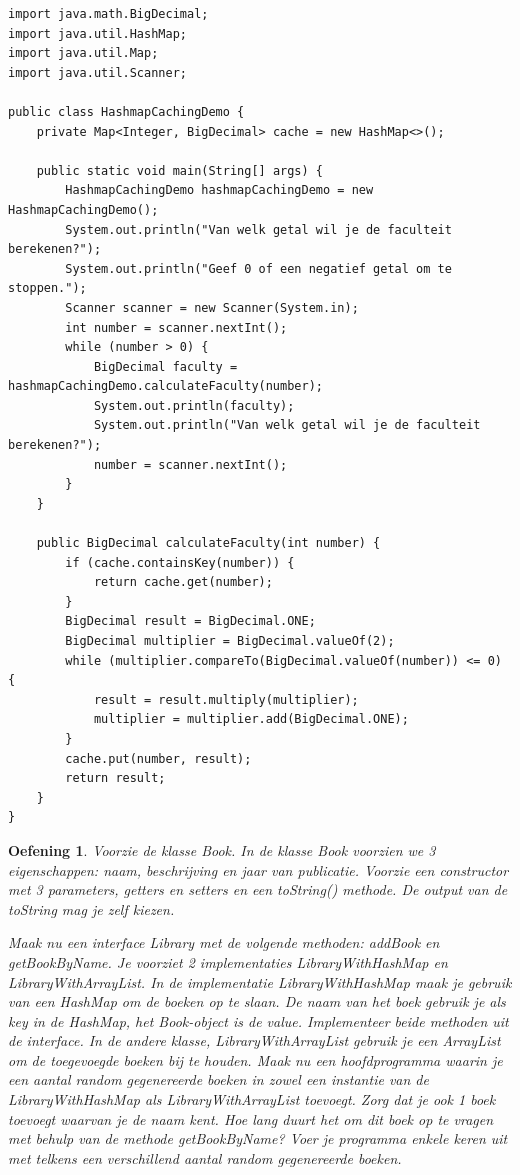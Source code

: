 \documentclass{tstextbook}
\newtheorem{envoefening}{Oefening}[chapter]
\newenvironment{oefening}
               {\begin{boxexercise}\begin{envoefening}}
               {\end{envoefening}\end{boxexercise}}
\begin{document}
\begin{lstlisting}
import java.math.BigDecimal;
import java.util.HashMap;
import java.util.Map;
import java.util.Scanner;

public class HashmapCachingDemo {
	private Map<Integer, BigDecimal> cache = new HashMap<>();

	public static void main(String[] args) {
		HashmapCachingDemo hashmapCachingDemo = new HashmapCachingDemo();
		System.out.println("Van welk getal wil je de faculteit berekenen?");
		System.out.println("Geef 0 of een negatief getal om te stoppen.");
		Scanner scanner = new Scanner(System.in);
		int number = scanner.nextInt();
		while (number > 0) {
			BigDecimal faculty = hashmapCachingDemo.calculateFaculty(number);
			System.out.println(faculty);
			System.out.println("Van welk getal wil je de faculteit berekenen?");
			number = scanner.nextInt();
		}
	}

	public BigDecimal calculateFaculty(int number) {
		if (cache.containsKey(number)) {
			return cache.get(number);
		}
		BigDecimal result = BigDecimal.ONE;
		BigDecimal multiplier = BigDecimal.valueOf(2);
		while (multiplier.compareTo(BigDecimal.valueOf(number)) <= 0) {
			result = result.multiply(multiplier);
			multiplier = multiplier.add(BigDecimal.ONE);
		}
		cache.put(number, result);
		return result;
	}
}
\end{lstlisting}

\begin{oefening}
Voorzie de klasse Book.  In de klasse Book voorzien we 3 eigenschappen: naam, beschrijving en jaar van publicatie. Voorzie een constructor met 3 parameters, getters en setters en een toString() methode. De output van de toString mag je zelf kiezen.

Maak nu een interface Library met de volgende methoden: addBook en getBookByName.  Je voorziet 2 implementaties LibraryWithHashMap en LibraryWithArrayList. In de implementatie LibraryWithHashMap maak je gebruik van een HashMap om de boeken op te slaan. De naam van het boek gebruik je als key in de HashMap, het Book-object is de value. Implementeer beide methoden uit de interface. In de andere klasse, LibraryWithArrayList gebruik je een ArrayList om de toegevoegde boeken bij te houden. 
Maak nu een hoofdprogramma waarin je een aantal random gegenereerde boeken in zowel een instantie van de LibraryWithHashMap als LibraryWithArrayList toevoegt.  Zorg dat je ook 1 boek toevoegt waarvan je de naam kent. Hoe lang duurt het om dit boek op te vragen met behulp van de methode getBookByName? Voer je programma enkele keren uit met telkens een verschillend aantal random gegenereerde boeken.
\end{oefening}
\end{document}
